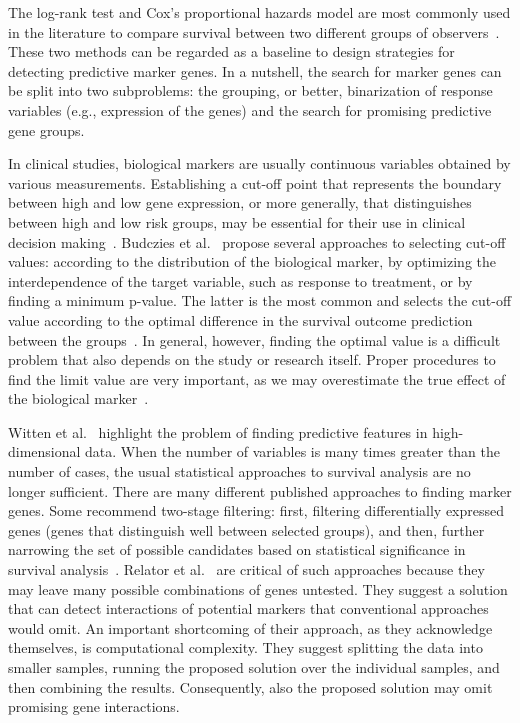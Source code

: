 \documentclass[11pt,a4paper]{article}
\begin{document}
The log-rank test and Cox's proportional hazards model are most commonly used in the literature to compare survival between two different groups of observers~\cite{singh2011survival}. These two methods can be regarded as a baseline to design strategies for detecting predictive marker genes. In a nutshell, the search for marker genes can be split into two subproblems: the grouping, or better, binarization of response variables (e.g., expression of the genes) and the search for promising predictive gene groups.

In clinical studies, biological markers are usually continuous variables obtained by various measurements. Establishing a cut-off point that represents the boundary between high and low gene expression, or more generally, that distinguishes between high and low risk groups, may be essential for their use in clinical decision making~\cite{mazumdar2000categorizing}. Budczies et al.~\cite{budczies2012cutoff} propose several approaches to selecting cut-off values: according to the distribution of the biological marker, by optimizing the interdependence of the target variable, such as response to treatment, or by finding a minimum p-value. The latter is the most common and selects the cut-off value according to the optimal difference in the survival outcome prediction between the groups~\cite{woo2020determination}. In general, however, finding the optimal value is a difficult problem that also depends on the study or research itself. Proper procedures to find the limit value are very important, as we may overestimate the true effect of the biological marker~\cite{Altman1991}.

Witten et al.~\cite{witten2010survival} highlight the problem of finding predictive features in high-dimensional data. When the number of variables is many times greater than the number of cases, the usual statistical approaches to survival analysis are no longer sufficient. There are many different published approaches to finding marker genes. Some recommend two-stage filtering: first, filtering differentially expressed genes (genes that distinguish well between selected groups), and then, further narrowing the set of possible candidates based on statistical significance in survival analysis~\cite{wang2017identification,liao2018identification,zhang2011discovery,kim2013identification}. Relator et al.~\cite{relator2018identifying} are critical of such approaches because they may leave many possible combinations of genes untested. They suggest a solution that can detect interactions of potential markers that conventional approaches would omit. An important shortcoming of their approach, as they acknowledge themselves, is computational complexity. They suggest splitting the data into smaller samples, running the proposed solution over the individual samples, and then combining the results. Consequently, also the proposed solution may omit promising gene interactions.
\end{document}
